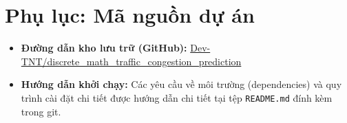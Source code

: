 \documentclass[12pt, a4paper]{article}
\begin{document}
\setcounter{page}{1} 


















\appendix
\section*{Phụ lục: Mã nguồn dự án}
\begin{itemize}
\item \textbf{Đường dẫn kho lưu trữ (GitHub):} \href{https://github.com/Dev-TNT/discrete_math_traffic_congestion_prediction.git}{Dev-TNT/discrete\_math\_traffic\_congestion\_prediction}    
\item \textbf{Hướng dẫn khởi chạy:} Các yêu cầu về môi trường (dependencies) và quy trình cài đặt chi tiết được hướng dẫn chi tiết tại tệp \texttt{README.md} đính kèm trong git.
\end{itemize}
\end{document}
